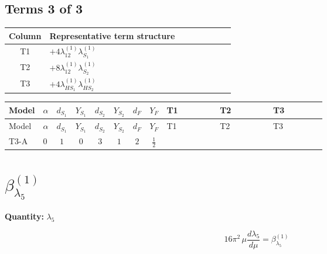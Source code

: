 \documentclass[8pt]{article}
\begin{document}
\begin{landscape}
\subsection*{Terms 3 of 3}
\begin{center}
\begin{tabular}{@{}c >{\raggedright\arraybackslash}p{0.82\linewidth}@{}}
\toprule
Column & Representative term structure \\
\midrule
T1 & \(\displaystyle +4 {\lambda_{12}^{(1)}} {\lambda_{S_1}^{(1)}}\) \\
\midrule
T2 & \(\displaystyle +8 {\lambda_{12}^{(1)}} {\lambda_{S_2}^{(1)}}\) \\
\midrule
T3 & \(\displaystyle +4 {\lambda_{HS_1}^{(1)}} {\lambda_{HS_2}^{(1)}}\) \\
\midrule
\bottomrule
\end{tabular}
\end{center}
\smallskip
\tiny
\begin{longtable}{@{}llcccccc >{\raggedright\arraybackslash}p{0.21\linewidth} >{\raggedright\arraybackslash}p{0.21\linewidth} >{\raggedright\arraybackslash}p{0.21\linewidth}@{}}
\toprule
Model & $\alpha$ & $d_{S_1}$ & $Y_{S_1}$ & $d_{S_2}$ & $Y_{S_2}$ & $d_F$ & $Y_F$ & T1 & T2 & T3 \\
\midrule
\endfirsthead
\toprule
Model & $\alpha$ & $d_{S_1}$ & $Y_{S_1}$ & $d_{S_2}$ & $Y_{S_2}$ & $d_F$ & $Y_F$ & T1 & T2 & T3 \\
\midrule
\endhead
T3-A & $0$ & $1$ & $0$ & $3$ & $1$ & $2$ & $\frac{1}{2}$ & \scriptsize\adjustbox{max width=\linewidth}{$\begin{gathered} +4 {\lambda_{12}^{(1)}} {\lambda_{S_1}^{(1)}}\end{gathered}$} & \scriptsize\adjustbox{max width=\linewidth}{$\begin{gathered} +8 {\lambda_{12}^{(1)}} {\lambda_{S_2}^{(1)}}\end{gathered}$} & \scriptsize\adjustbox{max width=\linewidth}{$\begin{gathered} +4 {\lambda_{HS_1}^{(1)}} {\lambda_{HS_2}^{(1)}}\end{gathered}$} \\
\midrule
\bottomrule
\end{longtable}
\clearpage
\section*{$\beta_{\lambda_5}^{(1)}$}
\noindent\textbf{Quantity: }$\lambda_5$\par\smallskip
\[16\pi^2\,\mu\frac{d \lambda_5}{d\mu}=\beta_{\lambda_5}^{(1)}\]

\end{landscape}
\end{document}
